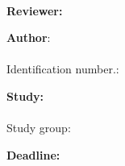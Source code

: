 

\begin{titlepage}

\begin{center}


\large {\institution}

\large {\documenttype}


~\vspace{1.5cm}\\

\LARGE \textbf{\documenttitle}

\LARGE {\documentsubtitle}

\vspace{2cm}


\large \textbf{Reviewer:}\\{\documentreviewer}

\large \textbf{Author}:\\{\documentauthor}\\Identification number.: {\identificationnumber}\\{\documentauthoraddress}

\large \textbf{Study:}\\{\studyprogramme}\\Study group: {\studygroup}

\large \textbf{Deadline:}\\{\submissiondate}


\end{center}


\end{titlepage}


